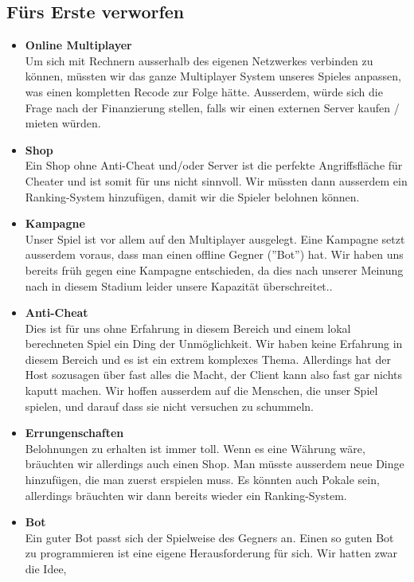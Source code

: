 \subsection{Fürs Erste verworfen}
\begin{itemize}
    \item \textbf{Online Multiplayer} \\
        Um sich mit Rechnern ausserhalb des eigenen Netzwerkes verbinden zu können, müssten wir das ganze Multiplayer System unseres Spieles anpassen, was einen kompletten Recode zur Folge hätte. 
        Ausserdem, würde sich die Frage nach der Finanzierung stellen, falls wir einen externen Server kaufen / mieten würden. 
    \item \textbf{Shop} \\
        Ein Shop ohne Anti-Cheat und/oder Server ist die perfekte Angriffsfläche für Cheater und ist somit für uns nicht sinnvoll. Wir müssten dann ausserdem ein Ranking-System
        hinzufügen, damit wir die Spieler belohnen können.
    \item \textbf{Kampagne} \\
        Unser Spiel ist vor allem auf den Multiplayer ausgelegt. Eine Kampagne setzt ausserdem voraus, dass man einen offline Gegner (''Bot'') hat. Wir haben uns bereits 
        früh gegen eine Kampagne entschieden, da dies nach unserer Meinung nach in diesem Stadium leider unsere Kapazität überschreitet..
    \item \textbf{Anti-Cheat} \\
        Dies ist für uns ohne Erfahrung in diesem Bereich und einem lokal berechneten Spiel ein Ding der Unmöglichkeit.
        Wir haben keine Erfahrung in diesem Bereich und es ist ein extrem komplexes Thema. Allerdings hat der Host sozusagen über fast alles die Macht, der Client kann also fast
        gar nichts kaputt machen. Wir hoffen ausserdem auf die Menschen, die unser Spiel spielen, und darauf dass sie nicht versuchen zu schummeln.
    \item \textbf{Errungenschaften} \\
        Belohnungen zu erhalten ist immer toll. Wenn es eine Währung wäre, bräuchten wir allerdings auch einen Shop. Man müsste ausserdem neue Dinge hinzufügen,
        die man zuerst erspielen muss. Es könnten auch Pokale sein, allerdings bräuchten wir dann bereits wieder ein Ranking-System.
    \item \textbf{Bot} \\
        Ein guter Bot passt sich der Spielweise des Gegners an. Einen so guten Bot zu programmieren ist eine eigene Herausforderung für sich. Wir hatten zwar die Idee,

\end{itemize}
